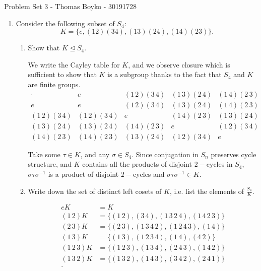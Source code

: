 \documentclass{article}
\begin{document}
    \huge Problem Set 3 - Thomas Boyko - 30191728
    \normalsize
\begin{enumerate} 

    \item Consider the following subset of $S_4$:
$$K = \{e, (1 2)(3 4), (1 3)(2 4), (1 4)(2 3)\}.$$
\begin{enumerate}[label= (\alph*)] 
    \item  Show that $K \trianglelefteq  S_4$.

        We write the Cayley table for $K$, and we observe closure which is sufficient to show that
        $K$ is a subgroup thanks to the fact that $S_4$ and $K$ are finite groups.
        \[
\begin{array}{c|cccc}
\cdot & e & (1\,2)(3\,4) & (1\,3)(2\,4) & (1\,4)(2\,3) \\
\hline
e & e & (1\,2)(3\,4) & (1\,3)(2\,4) & (1\,4)(2\,3) \\
(1\,2)(3\,4) & (1\,2)(3\,4) & e & (1\,4)(2\,3) & (1\,3)(2\,4) \\
(1\,3)(2\,4) & (1\,3)(2\,4) & (1\,4)(2\,3) & e & (1\,2)(3\,4) \\
(1\,4)(2\,3) & (1\,4)(2\,3) & (1\,3)(2\,4) & (1\,2)(3\,4) & e
\end{array}
\]

        Take some $\tau\in K$, and any $\sigma\in S_4$. Since conjugation in $S_n$ preserves cycle structure, and $K$ contains all the products of disjoint $2-$cycles in $S_4$, $\sigma\tau\sigma^{-1}$ is a product of disjoint $2-$cycles and $\sigma\tau\sigma^{-1}\in K$.

    \item  Write down the set of distinct left cosets of $K$, i.e. list the elements of $\frac{S_4}{K}$.

        \begin{align*}
            eK&=K\\
            (1\,2)K&= \{(1\,2),(3\,4),(1\,3\,2\,4),(1\,4\,2\,3)\}  \\
            (2\,3)K&= \{(2\,3),(1\,3\,4\,2),(1\,2\,4\,3),(1\,4)\}  \\
            (1\,3)K&= \{(1\,3),(1\,2\,3\,4),(1\,4),(4\,2)\}  \\
            (1\,2\,3)K&= \{(1\,2\,3),(1\,3\,4),(2\,4\,3),(1\,4\,2)\}  \\
            (1\,3\,2)K&= \{(1\,3\,2),(1\,4\,3),(3\,4\,2),(2\,4\,1)\}  \\
        .\end{align*}


\end{enumerate}
\end{enumerate}
\end{document}
